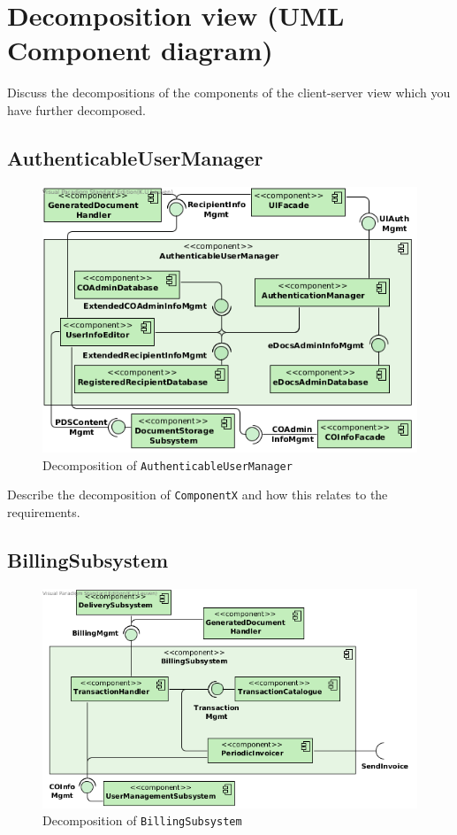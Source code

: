 \section{Decomposition view (UML Component diagram)}\label{sec:decomposition}
Discuss the decompositions of the components of the client-server view which
you have further decomposed.

\subsection{AuthenticableUserManager}
\begin{figure}[!htp]
    \centering
    \includegraphics[width=\textwidth]{figures/AuthenticableUserManager.png}
    \caption{Decomposition of \texttt{AuthenticableUserManager}}\label{fig:decomp-authuserman}
\end{figure}

Describe the decomposition of \texttt{ComponentX} and how this relates to the
requirements.

\subsection{BillingSubsystem}
\begin{figure}[!htp]
    \centering
    \includegraphics[width=\textwidth]{figures/Billing Subsystem.png}
    \caption{Decomposition of \texttt{BillingSubsystem}}\label{fig:decomp-billingsub}
\end{figure}


